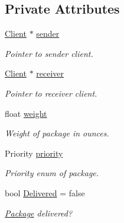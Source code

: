\subsection*{Private Attributes}
\begin{DoxyCompactItemize}
\item 
\hyperlink{classClient}{Client} $\ast$ \hyperlink{classPackage_abacbedc4dee7b03adc395e6591a14fc2}{sender}\hypertarget{classPackage_abacbedc4dee7b03adc395e6591a14fc2}{}\label{classPackage_abacbedc4dee7b03adc395e6591a14fc2}

\begin{DoxyCompactList}\small\item\em Pointer to sender client. \end{DoxyCompactList}\item 
\hyperlink{classClient}{Client} $\ast$ \hyperlink{classPackage_a9331feb10443764e6992894866731eb8}{receiver}\hypertarget{classPackage_a9331feb10443764e6992894866731eb8}{}\label{classPackage_a9331feb10443764e6992894866731eb8}

\begin{DoxyCompactList}\small\item\em Pointer to receiver client. \end{DoxyCompactList}\item 
float \hyperlink{classPackage_ae45dfddbca19f89d50d3ea0960ed0a11}{weight}\hypertarget{classPackage_ae45dfddbca19f89d50d3ea0960ed0a11}{}\label{classPackage_ae45dfddbca19f89d50d3ea0960ed0a11}

\begin{DoxyCompactList}\small\item\em Weight of package in ounces. \end{DoxyCompactList}\item 
Priority \hyperlink{classPackage_a4ba73df5afb3cdd936d297652ce9af99}{priority}\hypertarget{classPackage_a4ba73df5afb3cdd936d297652ce9af99}{}\label{classPackage_a4ba73df5afb3cdd936d297652ce9af99}

\begin{DoxyCompactList}\small\item\em Priority enum of package. \end{DoxyCompactList}\item 
bool \hyperlink{classPackage_a68e383f4da8ac54fb275c752684eaf00}{Delivered} = false\hypertarget{classPackage_a68e383f4da8ac54fb275c752684eaf00}{}\label{classPackage_a68e383f4da8ac54fb275c752684eaf00}

\begin{DoxyCompactList}\small\item\em \hyperlink{classPackage}{Package} delivered? \end{DoxyCompactList}\end{DoxyCompactItemize}
